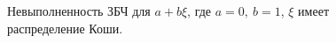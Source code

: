 \documentclass[12pt, a4paper]{article}
\begin{document}
\begin{figure}[H]
\caption{Невыполненность ЗБЧ для $a+b\xi$, где $a=0,\ b=1$, $\xi$ имеет распределение Коши.}
\end{figure}
\end{document}
